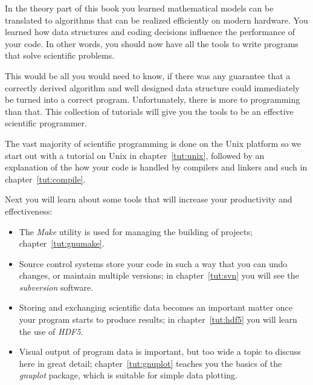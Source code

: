 
In the theory part of this book you learned mathematical models can be
translated to algorithms that can be realized efficiently on modern
hardware. You learned how data structures and coding decisions
influence the performance of your code. In other words, you should now
have all the tools to write programs that solve scientific problems.

This would be all you would need to know,
if there was any guarantee that a correctly derived algorithm and
well designed data structure could immediately be turned into a
correct program.
Unfortunately, there is more to programming than that. This collection
of tutorials will give you the tools to be an effective scientific
programmer.

The vast majority of
scientific programming is done on the Unix platform so we start out
with a tutorial on Unix in chapter~\ref{tut:unix}, followed by an
explanation of the how your code is handled by compilers and linkers
and such in chapter~\ref{tut:compile}.

Next you will learn about some tools that will increase your
productivity and effectiveness: 
\begin{itemize}
\item The \emph{Make} utility is used for managing the building of
  projects; chapter~\ref{tut:gnumake}.
\item Source control systems store your code in such a way that you
  can undo changes, or maintain multiple versions; in
  chapter~\ref{tut:svn} you will see the \emph{subversion} software.
\item Storing and exchanging scientific data becomes an important
  matter once your program starts to produce results; in
  chapter~\ref{tut:hdf5} you will learn the use of \emph{HDF5}.
\item Visual output of program data is important, but too wide a topic
  to discuss here in great detail; chapter~\ref{tut:gnuplot} teaches
  you the basics of the \emph{gnuplot} package, which is suitable for
  simple data plotting.
\end{itemize}

